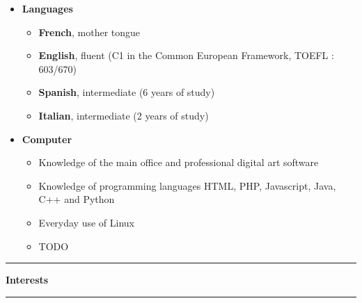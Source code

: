 \documentclass[a4paper,11pt]{article} %
\newcommand{\trad}[2]{#1}
\newcommand{\titre}[1]{%
	\begin{center}
	\rule{\textwidth}{1pt}
	\par
	\vspace{0.1cm}
        \textbf{\large #1}
	\par\rule{\textwidth}{1pt}
	\end{center}
	}
\begin{document}
\begin{itemize}
\item \textbf{\trad{Languages}{Langues}}
	\begin{itemize} 
	\trad{\item \textbf{French}, mother tongue}{}
	\item \trad{\textbf{English}, fluent (C1 in the Common European Framework, TOEFL : 603/670)}{\textbf{Anglais}, autonome (niveau C1 du cadre européen de référence, TOEFL : 603/670)}
	\item \trad{\textbf{Spanish}, intermediate (6 years of study)}{\textbf{Espagnol}, niveau intermédiaire (6 années d'études)}
	\item \trad{\textbf{Italian}, intermediate (2 years of study)}{\textbf{Italien}, niveau intermédiaire (2 années d'études)}
	\end{itemize}
\item \textbf{\trad{Computer}{Informatique}}
	\begin{itemize}
	\item \trad{Knowledge of the main office and professional digital art software}             {Maîtrise des principaux outils de bureautique et d'infographie professionnelle}
	\item \trad{Knowledge of programming languages HTML, PHP, Javascript, Java, C++ and Python}            {Expérimenté dans les languages HTML, PHP, Javascript, Java, C++ et Python}
	\item \trad{Everyday use of Linux}                                                          {Utilisation quotidienne d'environnements Linux}
    \item \trad{TODO}                                                                           {Expérience dans l'utilisation de moteurs de rendu temps réel et moteurs physiques}
	\end{itemize}
\end{itemize}

\titre{\trad{Interests}{Centres d'Intérêts}}

\end{document}
